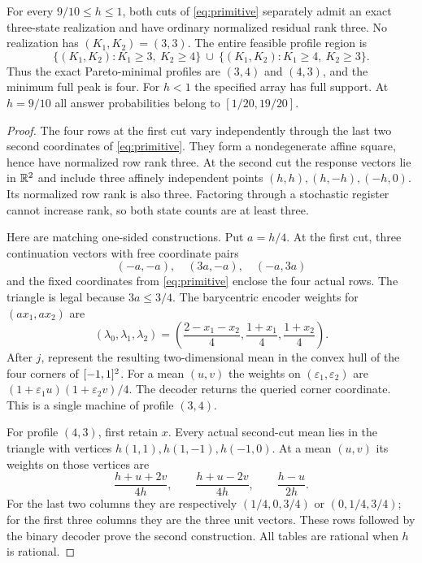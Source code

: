 \begin{theorem}
\label{thm:obstruction}
For every $9/10\le h\le1$, both cuts of \eqref{eq:primitive}
separately admit an exact three-state realization and have ordinary
normalized residual rank three. No realization has $(K_1,K_2)=(3,3)$.
The entire feasible profile region is
\begin{equation}\label{eq:pareto}
 \{(K_1,K_2):K_1\ge3,\ K_2\ge4\}
 \ \cup\ \{(K_1,K_2):K_1\ge4,\ K_2\ge3\}.
\end{equation}
Thus the exact Pareto-minimal profiles are $(3,4)$ and $(4,3)$, and the
minimum full peak is four. For $h<1$ the specified array has full
support. At $h=9/10$ all answer probabilities belong to
$[1/20,19/20]$.
\end{theorem}
\begin{proof}
The four rows at the first cut vary independently through the last two
second coordinates of \eqref{eq:primitive}. They form a
nondegenerate affine square, hence have normalized row rank three. At
the second cut the response vectors lie in $\mathbb R^2$ and include three
affinely independent points $(h,h),(h,-h),(-h,0)$. Its normalized row
rank is also three. Factoring through a stochastic register cannot
increase rank, so both state counts are at least three.

Here are matching one-sided constructions. Put $a=h/4$. At the first
cut, three continuation vectors with free coordinate pairs
\begin{equation}\label{eq:parent-triangle}
                (-a,-a),\quad(3a,-a),\quad(-a,3a)
\end{equation}
and the fixed coordinates from \eqref{eq:primitive} enclose the
four actual rows. The triangle is legal because $3a\le3/4$. The
barycentric encoder weights for $(ax_1,ax_2)$ are
\[
 (\lambda_0,\lambda_1,\lambda_2)
   =\left(\frac{2-x_1-x_2}{4},\frac{1+x_1}{4},\frac{1+x_2}{4}\right).
\]
After $j$, represent the resulting two-dimensional mean in the convex
hull of the four corners of $[-1,1]^2$. For a mean $(u,v)$ the weights
on $(\varepsilon_1,\varepsilon_2)$ are
$(1+\varepsilon_1u)(1+\varepsilon_2v)/4$. The decoder returns the
queried corner coordinate. This is a single machine of profile $(3,4)$.

For profile $(4,3)$, first retain $x$. Every actual second-cut mean lies
in the triangle with vertices $h(1,1),h(1,-1),h(-1,0)$. At a mean
$(u,v)$ its weights on those vertices are
\begin{equation}\label{eq:child-triangle-weights}
 \frac{h+u+2v}{4h},\qquad\frac{h+u-2v}{4h},\qquad\frac{h-u}{2h}.
\end{equation}
For the last two columns they are respectively $(1/4,0,3/4)$ or
$(0,1/4,3/4)$; for the first three columns they are the three unit
vectors. These rows followed by the binary decoder prove the second
construction. All tables are rational when $h$ is rational.


\end{proof}
